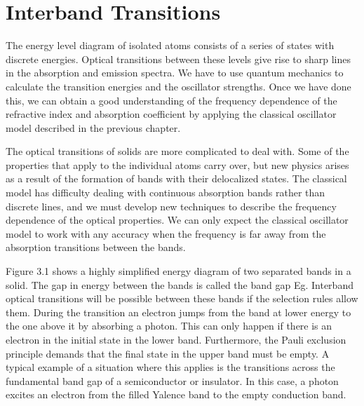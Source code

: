 \documentclass[12pt]{book}
\begin{document}
\section{Interband Transitions}
The energy level diagram of isolated atoms consists of a series of states with discrete energies. Optical transitions between these levels give rise to sharp lines in the absorption and emission spectra. We have to use quantum mechanics to calculate the transition energies and the oscillator strengths. Once we have done this, we can obtain a good understanding of the frequency dependence of the refractive index and absorption coefficient by applying the classical oscillator model described in the previous chapter.

The optical transitions of solids are more complicated to deal with. Some of the properties that apply to the individual atoms carry over, but new physics arises as a result of the formation of bands with their delocalized states. The classical model has difficulty dealing with continuous absorption bands rather than discrete lines, and we must develop new techniques to describe the frequency dependence of the optical properties. We can only expect the classical oscillator model to work with any accuracy when the frequency is far away from the absorption transitions between the bands.


Figure 3.1 shows a highly simplified energy diagram of two separated bands in a solid. The gap in energy between the bands is called the band gap Eg. Interband optical transitions will be possible between these bands if the selection rules allow them. During the transition an electron jumps from the band at lower energy to the one above it by absorbing a photon. This can only happen if there is an electron in the initial state in the lower band. Furthermore, the Pauli exclusion principle demands that the final state in the upper band must be empty. A typical example of a situation where this applies is the transitions across the fundamental band gap of a semiconductor or insulator. In this case, a photon excites an electron from the filled Yalence band to the empty conduction band.
\end{document}
